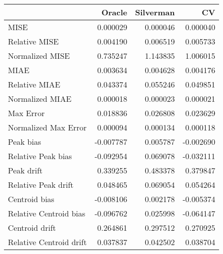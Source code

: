 \begin{tabular}{lrrr}
  \hline
 & Oracle & Silverman & CV \\ 
  \hline
MISE & 0.000029 & 0.000046 & 0.000040 \\ 
  Relative MISE & 0.004190 & 0.006519 & 0.005733 \\ 
  Normalized MISE & 0.735247 & 1.143835 & 1.006015 \\ 
  MIAE & 0.003634 & 0.004628 & 0.004176 \\ 
  Relative MIAE & 0.043374 & 0.055246 & 0.049851 \\ 
  Normalized MIAE & 0.000018 & 0.000023 & 0.000021 \\ 
  Max Error & 0.018836 & 0.026808 & 0.023629 \\ 
  Normalized Max Error & 0.000094 & 0.000134 & 0.000118 \\ 
  Peak bias & -0.007787 & 0.005787 & -0.002690 \\ 
  Relative Peak bias & -0.092954 & 0.069078 & -0.032111 \\ 
  Peak drift & 0.339255 & 0.483378 & 0.379847 \\ 
  Relative Peak drift & 0.048465 & 0.069054 & 0.054264 \\ 
  Centroid bias & -0.008106 & 0.002178 & -0.005374 \\ 
  Relative Centroid bias & -0.096762 & 0.025998 & -0.064147 \\ 
  Centroid drift & 0.264861 & 0.297512 & 0.270925 \\ 
  Relative Centroid drift & 0.037837 & 0.042502 & 0.038704 \\ 
   \hline
\end{tabular}
